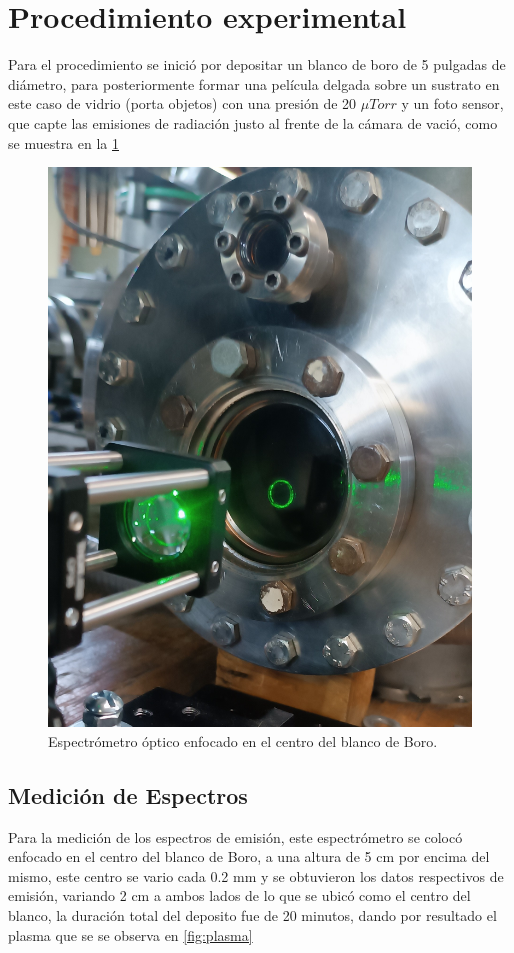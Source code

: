 \documentclass[12pt]{IEEEtran}
\begin{document}
\section{Procedimiento experimental}

Para el procedimiento se inició por depositar un blanco de boro de 5 pulgadas de diámetro, para posteriormente formar una película delgada sobre un sustrato en este caso de vidrio (porta objetos) con una presión de 20 $\mu Torr$ y un foto sensor, que capte las emisiones de radiación justo al frente de la cámara de vació, como se muestra en la \ref{fig:Espectometro}


\begin{figure}[htp]
	\centering
	\includegraphics[width=0.6\linewidth]{figs/buenaaaaaaaaa.jpg}
	\caption{Espectrómetro óptico enfocado en el centro del blanco de Boro.}
	\label{fig:Espectometro}
\end{figure}

\subsection{Medición de Espectros}

Para la medición de los espectros de emisión, este espectrómetro se colocó enfocado en el centro del blanco de Boro, a una altura de 5 cm por encima del mismo, este centro se vario cada 0.2 mm y se obtuvieron los datos respectivos de emisión, variando 2 cm a ambos lados de lo que se ubicó como el centro del blanco, la duración total del deposito fue de 20 minutos, dando por resultado el plasma que se se observa en \ref{fig:plasma}
\end{document}
